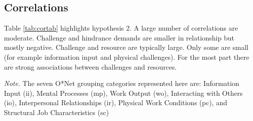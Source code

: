 \documentclass[
  english,
  man]{apa6}
\newenvironment{lltable}{\begin{landscape}\begin{center}\begin{ThreePartTable}}{\end{ThreePartTable}\end{center}\end{landscape}}
\begin{document}
\hypertarget{correlations}{%
\subsection{Correlations}\label{correlations}}

Table \ref{tab:cortab} highlights hypothesis 2. A large number of correlations are moderate. Challenge and hindrance demands are smaller in relationship but mostly negative. Challenge and resource are typically large. Only some are small (for example information input and physical challenges). For the most part there are strong associations between challenges and resources.

\begin{lltable}

\begin{TableNotes}[para]
\normalsize{\textit{Note.} The seven O*Net grouping categories represented here are: Information Input (ii), Mental Processes (mp), Work Output (wo), Interacting with Others (io), Interpersonal Relationships (ir), Physical Work Conditions (pc), and Structural Job Characteristics (sc)}
\end{TableNotes}

\small{

}
\end{lltable}
\end{document}
